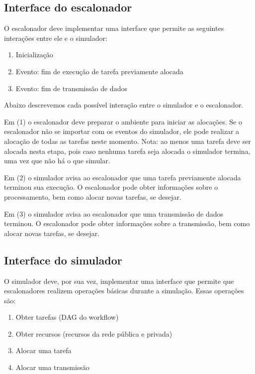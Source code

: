 \documentclass[a4paper,10pt]{article}
\begin{document}
\subsection{Interface do escalonador}

O escalonador deve implementar uma interface que permite as seguintes
interações entre ele e o simulador:

\begin{enumerate}

  \item Inicialização
  \item Evento: fim de execução de tarefa previamente alocada
  \item Evento: fim de transmissão de dados

\end{enumerate}

Abaixo descrevemos cada possível interação entre o simulador e o escalonador.

Em (1) o escalonador deve preparar o ambiente para iniciar as alocações. Se o escalonador
não se importar com os eventos do simulador, ele pode realizar a alocação de todas as tarefas
neste momento. Nota: ao menos uma tarefa deve ser alocada nesta etapa, pois caso nenhuma tarefa
seja alocada o simulador termina, uma vez que não há o que simular.

Em (2) o simulador avisa ao escalonador que uma tarefa previamente alocada terminou sua execução.
O escalonador pode obter informações sobre o processamento, bem como alocar novas tarefas, se desejar.

Em (3) o simulador avisa ao escalonador que uma transmissão de dados terminou.
O escalonador pode obter informações sobre a transmissão, bem como alocar novas tarefas, se desejar.

\subsection{Interface do simulador}

O simulador deve, por sua vez, implementar uma interface que permite que escalonadores
realizem operações básicas durante a simulação. Essas operações são:

\begin{enumerate}

  \item Obter tarefas (DAG do workflow)
  \item Obter recursos (recursos da rede pública e privada)
  \item Alocar uma tarefa
  \item Alocar uma transmissão

\end{enumerate}
\end{document}
